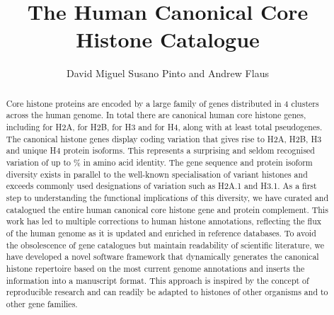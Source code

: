 \documentclass[10pt,a4paper,onecolumn,article,draft]{memoir}
\author{David Miguel Susano Pinto and Andrew Flaus}
\title{The Human Canonical Core Histone Catalogue}
\begin{document}

  \maketitle

  \begin{abstract}
	Core histone proteins are encoded by a large family of genes distributed in 4 clusters across the human genome.
	In total there are \TotalGenes{} canonical human core histone genes, including
	\HTwoACodingGenes{} for H2A, \HTwoBCodingGenes{} for H2B,
	\HThreeCodingGenes{} for H3 and \HFourCodingGenes{} for H4, 
	along with at least \TotalPseudoGenes{} total pseudogenes.
	The canonical histone genes display coding variation that gives rise to
	\HTwoAUniqueProteins{} H2A, \HTwoBUniqueProteins{} H2B, 
	\HThreeUniqueProteins{} H3 and \HFourUniqueProteins{} unique H4 protein isoforms.
	This represents a surprising and seldom recognised variation
	of up to \% in amino acid identity. 
	The gene sequence and protein isoform diversity exists 
	in parallel to the well-known specialisation of variant histones 
	and exceeds commonly used designations of variation such as H2A.1 and H3.1. 
	As a first step to understanding the functional implications of this diversity, 
	we have curated and catalogued the entire human canonical core histone gene and protein complement.
	This work has led to multiple corrections to human histone annotations, 
	reflecting the flux of the human genome as it is updated and enriched in reference databases. 
	To avoid the obsolescence of gene catalogues but maintain readability of scientific literature, 
	we have developed a novel software framework that dynamically generates the canonical histone repertoire 
	based on the most current genome annotations and inserts the information into a manuscript format. 
	This approach is inspired by the concept of reproducible research 
	and can readily be adapted to histones of other organisms and to other gene families.
  \end{abstract}
\end{document}
